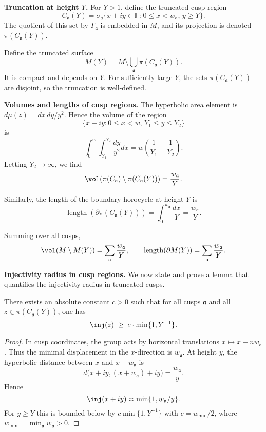 \noindent\textbf{Truncation at height $Y$.}
For $Y>1$, define the truncated cusp region
\[
  C_{\mathfrak{a}}(Y)
  = \sigma_{\mathfrak{a}}\{ x+iy \in \mathbb{H} : 0\le x < w_{\mathfrak{a}}, \, y\ge Y \}.
\]
The quotient of this set by $\Gamma_{\mathfrak{a}}$ is embedded in $M$,
and its projection is denoted $\pi(C_{\mathfrak{a}}(Y))$.

\medskip

\noindent
Define the truncated surface
\[
  M(Y) = M \setminus \bigcup_{\mathfrak{a}} \pi(C_{\mathfrak{a}}(Y)).
\]
It is compact and depends on $Y$.
For sufficiently large $Y$, the sets $\pi(C_{\mathfrak{a}}(Y))$ are disjoint,
so the truncation is well-defined.

\medskip

\noindent\textbf{Volumes and lengths of cusp regions.}
The hyperbolic area element is $d\mu(z)=dx\,dy/y^{2}$.
Hence the volume of the region
\[
  \{ x+iy : 0\le x<w,\, Y_{1}\le y \le Y_{2} \}
\]
is
\[
  \int_{0}^{w}\int_{Y_{1}}^{Y_{2}} \frac{dy}{y^{2}} dx
  = w \left(\frac{1}{Y_{1}} - \frac{1}{Y_{2}}\right).
\]
Letting $Y_{2}\to\infty$, we find
\[
  \vol(\pi(C_{\mathfrak{a}})\setminus \pi(C_{\mathfrak{a}}(Y)))
  = \frac{w_{\mathfrak{a}}}{Y}.
\]

\medskip

\noindent
Similarly, the length of the boundary horocycle at height $Y$ is
\[
  \operatorname{length}(\partial \pi(C_{\mathfrak{a}}(Y)))
  = \int_{0}^{w_{\mathfrak{a}}}\frac{dx}{Y}
  = \frac{w_{\mathfrak{a}}}{Y}.
\]

\medskip

\noindent
Summing over all cusps,
\[
  \vol(M\setminus M(Y)) = \sum_{\mathfrak{a}} \frac{w_{\mathfrak{a}}}{Y},
  \qquad
  \operatorname{length}(\partial M(Y)) = \sum_{\mathfrak{a}} \frac{w_{\mathfrak{a}}}{Y}.
\]

\medskip

\noindent\textbf{Injectivity radius in cusp regions.}
We now state and prove a lemma that quantifies the injectivity radius in truncated cusps.

\begin{lemma}
There exists an absolute constant $c>0$ such that for all cusps $\mathfrak{a}$ and all
$z\in \pi(C_{\mathfrak{a}}(Y))$, one has
\[
  \inj(z) \;\geq\; c \cdot \min\{1, Y^{-1}\}.
\]
\end{lemma}

\begin{proof}
In cusp coordinates, the group acts by horizontal translations $x\mapsto x+nw_{\mathfrak{a}}$.
Thus the minimal displacement in the $x$-direction is $w_{\mathfrak{a}}$.
At height $y$, the hyperbolic distance between $x$ and $x+w_{\mathfrak{a}}$ is
\[
  d\big(x+iy, (x+w_{\mathfrak{a}})+iy\big) = \frac{w_{\mathfrak{a}}}{y}.
\]
Hence
\[
  \inj(x+iy) \asymp \min\{1, w_{\mathfrak{a}}/y\}.
\]
For $y\ge Y$ this is bounded below by $c\min\{1,Y^{-1}\}$ with $c=w_{\min}/2$, where $w_{\min}=\min_{\mathfrak{a}} w_{\mathfrak{a}}>0$.
\end{proof}


